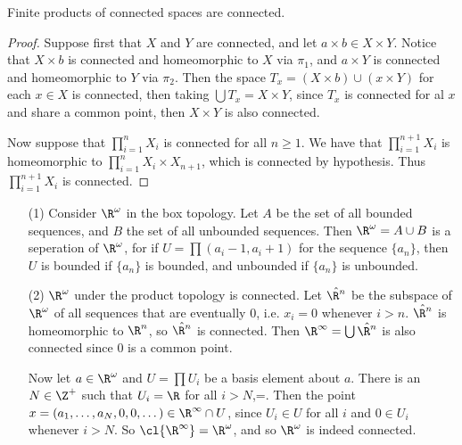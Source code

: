 \begin{theorem}\label{3.1.7}
    Finite products of connected spaces are connected.
\end{theorem}
\begin{proof}
    Suppose first that $X$ and  $Y$ are connected, and let  $a \times b \in X \times Y$. Notice that
     $X \times b$ is connected and homeomorphic to  $X$ via  $\pi_1$, and $a \times Y$ is connected
     and homeomorphic to  $Y$ via  $\pi_2$. Then the space $T_x=(X \times b) \cup (x \times Y)$ for
     each $x \in X$ is connected, then taking  $\bigcup{T_x}=X \times Y$, since $T_x$ is connected
     for al  $x$ and share a common point, then  $X \times Y$ is also connected.

     Now suppose that  $\prod_{i=1}^{n}{X_i}$ is connected for all $n \geq 1$. We have that
     $\prod_{i=1}^{n+1}{X_i}$ is homeomorphic to $\prod_{i=1}^{n}{X_i} \times X_{n+1}$, which is
     connected by hypothesis. Thus $\prod_{i=1}^{n+1}{X_i}$ is connected.
\end{proof}

\begin{example}
    \begin{enumerate}
        \item[(1)] Consider $\R^{\omega}$ in the box topology. Let $A$ be the set of all bounded
            sequences, and  $B$ the set of all unbounded sequences. Then  $\R^{\omega}=A \cup B$ is
            a seperation of $\R^{\omega}$, for if $U=\prod{(a_i-1,a_i+1)}$ for the sequence
            $\{a_n\}$, then $U$ is bounded if  $\{a_n\}$ is bounded, and unbounded if $\{a_n\}$ is
            unbounded.

        \item[(2)] $\R^{\omega}$ under the product topology is connected. Let $\hat{\R^n}$ be the
            subspace of $\R^{\omega}$ of all sequences that are eventually $0$, i.e.  $x_i=0$
            whenever  $i>n$.  $\hat{\R^n}$ is homeomorphic to $\R^n$, so  $\hat{\R^n}$ is connected.
            Then $\R^{\infty}=\bigcup{\hat{\R^n}}$ is also connected since $0$ is a common point.

            Now let  $a \in \R^{\omega}$ and $U=\prod{U_i}$ be a basis element about $a$. There is
            an  $N \in \Z^+$ such that  $U_i=\R$ for all  $i>N$,=. Then the point  $x=(a_1,\dots,
            a_N,0,0,\dots) \in \R^{\infty} \cap U$, since $U_i \in U$ for all  $i$ and  $0 \in U_i$
            whenever  $i>N$. So $\cl {\R^{\infty}}=\R^{\omega}$, and so $\R^{\omega}$ is indeed
            connected.
    \end{enumerate}
\end{example}
